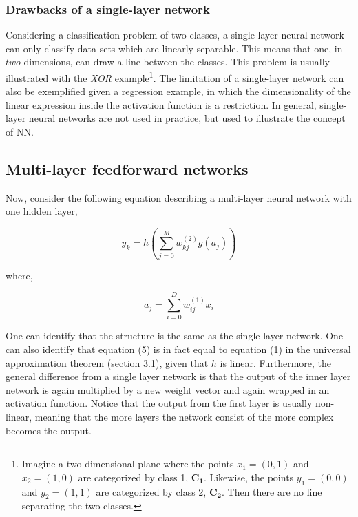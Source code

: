\documentclass[12pt, letterpaper]{amsart}%
\begin{document}
\subsubsection{Drawbacks of a single-layer network}
Considering a classification problem of two classes, a single-layer neural network can only classify data sets which are linearly separable. This means that one, in $two$-dimensions, can draw a line between the classes. This problem is usually illustrated with the \textit{XOR} example\footnote{Imagine a two-dimensional plane where the points $x_1 = (0,1)$ and $x_2 = (1,0)$ are categorized by class 1, $\mathbf{C_1}$. Likewise, the points $y_1=(0,0)$ and $y_2=(1,1)$ are categorized by class 2, $\mathbf{C_2}$. Then there are no line separating the two classes.}. The limitation of a single-layer network can also be exemplified given a regression example, in which the dimensionality of the linear expression inside the activation function is a restriction. In general, single-layer neural networks are not used in practice, but used to illustrate the concept of NN. 


\subsection{Multi-layer feedforward networks}
Now, consider the following equation describing a multi-layer neural network with one hidden layer,

\begin{equation}
y_k = h \left( \sum_{j=0}^M w_{kj}^{(2)} g \left( a_j \right) \right)
\end{equation}

where,

\begin{equation}
a_j = \sum_{i=0}^D w_{ij}^{(1)} x_i
\end{equation}

One can identify that the structure is the same as the single-layer network. One can also identify that equation (5) is in fact equal to equation (1) in the universal approximation theorem (section 3.1), given that $h$ is linear. Furthermore, the general difference from a single layer network is that the output of the inner layer network is again multiplied by a new weight vector and again wrapped in an activation function. Notice that the output from the first layer is usually non-linear, meaning that the more layers the network consist of the more complex becomes the output.
\\
\end{document}
